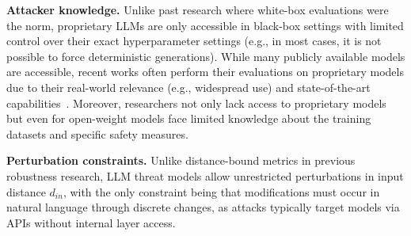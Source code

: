 



\textbf{Attacker knowledge.}  Unlike past research where white-box evaluations were the norm, proprietary LLMs are only accessible in black-box settings with limited control over their exact hyperparameter settings (e.g., in most cases, it is not possible to force deterministic generations). While many publicly available models are accessible, recent works often perform their evaluations on proprietary models due to their real-world relevance (e.g., widespread use) and state-of-the-art capabilities~\cite{andriushchenko2024jailbreaking}. Moreover, researchers not only lack access to proprietary models but even for open-weight models face limited knowledge about the training datasets and specific safety measures.

\textbf{Perturbation constraints.} Unlike distance-bound metrics in previous robustness research, LLM threat models allow unrestricted perturbations in input distance $d_{in}$, with the only constraint being that modifications must occur in natural language through discrete changes, as attacks typically target models via APIs without internal layer access.


